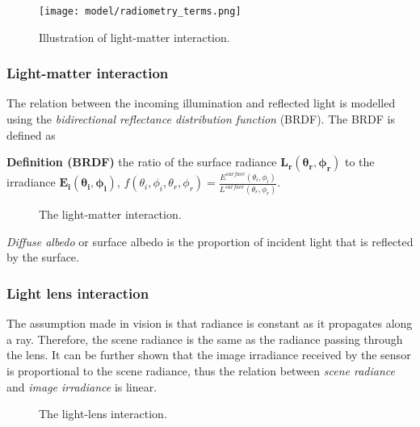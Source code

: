 \begin{figure}[!htbp]
\centering
\texttt{[image: model/radiometry\_terms.png]}
\caption{Illustration of light-matter interaction.}
\label{fig:radiometry_terms}
\end{figure}

\subsubsection{Light-matter interaction}
The relation between the incoming illumination and reflected light is modelled using the \textit{bidirectional reflectance distribution function} (BRDF). The BRDF is defined as

\noindent\textbf{Definition (BRDF)} the ratio of the surface radiance $\mathbf{L_r(\theta_r, \phi_r)}$ to the irradiance $\mathbf{E_i(\theta_i, \phi_i)}$, \ie $f(\theta_i, \phi_i, \theta_r, \phi_r)=\frac{E^{surface}(\theta_i, \phi_i)}{L^{surface}(\theta_r, \phi_r)}$.
\begin{figure}[!htbp]
\centering
{}
\caption{The light-matter interaction.}
\label{fig:light_matter_interact}
\end{figure}

\textit{Diffuse albedo} or surface albedo is the proportion of incident light that is reflected by the surface. 

\subsubsection{Light lens interaction}
The assumption made in vision is that radiance is constant as it propagates along a ray. Therefore, the scene radiance is the same as the radiance passing through the lens. It can be further shown that the image irradiance received by the sensor is proportional to the scene radiance, thus the relation between \textit{scene radiance} and \textit{image irradiance} is linear.
\begin{figure}[!ht]
\centering
{}
\caption{The light-lens interaction.}
\label{fig:light_lens_interact}
\end{figure}

